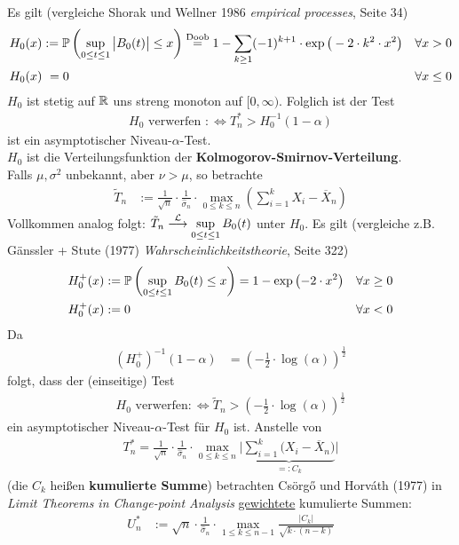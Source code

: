 Es gilt (vergleiche Shorak und Wellner 1986 \textit{empirical processes}, Seite 34)
\begin{align*}
H_0(x)&:=\P\left(\sup\limits_{0\leq t\leq 1}\big|B_0(t)\big|\leq x\right)
\overset{\text{Doob}}{=}
1-\sum\limits_{k\geq 1}(-1)^{k+1}\cdot\exp\big(-2\cdot k^2\cdot x^2\big)&\forall x>0\\
H_0(x)&~=0 &\forall x\leq 0
\end{align*}
$H_0$ ist stetig auf $\R$ uns streng monoton auf $[0,\infty)$. Folglich ist der Test
\begin{align*}
H_0\text{ verwerfen }:\Longleftrightarrow T_n^\ast>H_0^{-1}(1-\alpha)
\end{align*}
ist ein asymptotischer Niveau-$\alpha$-Test.\\
$H_0$ ist die Verteilungsfunktion der \textbf{Kolmogorov-Smirnov-Verteilung}.\\
Falls $\mu,\sigma^2$ unbekannt, aber $\nu>\mu$, so betrachte 
\begin{align*}
\tilde{T}_n&:=\frac{1}{\sqrt{n}}\cdot\frac{1}{\hat{\sigma}_n}\cdot\max\limits_{0\leq k\leq n}\left(\sum\limits_{i=1}^kX_i-\overline{X}_n\right)
\end{align*}
Vollkommen analog folgt: $\tilde{T}_n\stackrel{\L}{\longrightarrow}\sup\limits_{0\leq t\leq 1} B_0(t)$ unter $H_0$. Es gilt (vergleiche z.B. Gänssler + Stute (1977) \textit{Wahrscheinlichkeitstheorie}, Seite 322)
\begin{align*}
H_0^+(x)&:=\P\left(\sup\limits_{0\leq t\leq 1}B_0(t)\leq x\right)=1-\exp\left(-2\cdot x^2\right) &\forall x\geq0\\
H_0^+(x)&:=0 &\forall x<0
\end{align*}
Da 
\begin{align*}
(H_0^+)^{-1}(1-\alpha)&=\left(-\frac{1}{2}\cdot\log(\alpha)\right)^{\frac{1}{2}}
\end{align*}
folgt, dass der (einseitige) Test
\begin{align*}
H_0\text{ verwerfen}:\Longleftrightarrow\tilde{T}_n>\left(-\frac{1}{2}\cdot\log(\alpha)\right)^{\frac{1}{2}}
\end{align*}
ein asymptotischer Niveau-$\alpha$-Test für $H_0$ ist.\nl
Anstelle von
\begin{align*}
T_n^\ast=\frac{1}{\sqrt{n}}\cdot\frac{1}{\hat{\sigma}_n}\cdot\max\limits_{0\leq k \leq n}\bigg|\underbrace{\sum\limits_{i=1}^k\big(X_i-\overline{X}_n\big)}_{=:C_k}\bigg|
\end{align*}
(die $C_k$ heißen \textbf{kumulierte Summe}) betrachten Csörgő und Horváth (1977) in \textit{Limit Theorems in Change-point Analysis} \ul{gewichtete} kumulierte Summen:
\begin{align*}
U_n^\ast&:=\sqrt{n}\cdot\frac{1}{\hat{\sigma}_n}\cdot\max\limits_{1\leq k\leq n-1}\frac{|C_k|}{\sqrt{k\cdot(n-k)}}
\end{align*}

